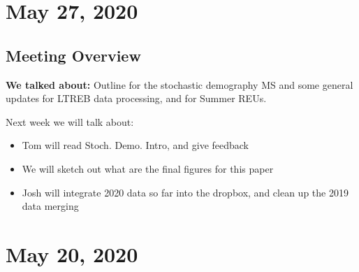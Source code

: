 \documentclass{article}
\begin{document}
\section*{May 27, 2020}
\subsection*{Meeting Overview}
\textbf{We talked about:}
Outline for the stochastic demography MS and some general updates for LTREB data processing, and for Summer REUs. 

Next week we will talk about:
\begin{itemize}
\item{Tom will read Stoch. Demo. Intro, and give feedback}
\item{We will sketch out what are the final figures for this paper}
\item{Josh will integrate 2020 data so far into the dropbox, and clean up the 2019 data merging}
\end{itemize}

\section*{May 20, 2020}
\end{document}
